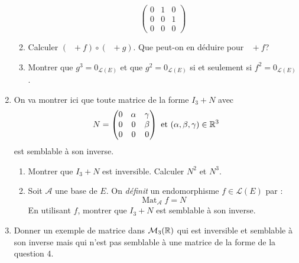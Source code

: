 \begin{enumerate}
\begin{enumerate}
\begin{displaymath}
\begin{pmatrix}
 0&1&0\\0&0&1\\0&0&0
\end{pmatrix}
\end{displaymath}
\item Calculer 
$(\mathop{\mathrm{id}_E}+f)\circ  (\mathop{\mathrm{id}_E}+g)$.
 Que peut-on en déduire pour $\mathop{\mathrm{id}_E}+f$?
\item Montrer que $g^3= 0_{\mathcal L(E)}$ et que  $g^2=0_{\mathcal L(E)}$ si et seulement si $f^2=0_{\mathcal L(E)}$.
\end{enumerate}
\item On va montrer ici que toute matrice de la forme $I_3+N$ avec
\begin{displaymath}
N=
 \begin{pmatrix}
  0&\alpha&\gamma\\0&0&\beta\\0&0&0
 \end{pmatrix}
\text{ et }
(\alpha,\beta,\gamma)\in \mathbb{R}^3
\end{displaymath}
est semblable à son inverse.
\begin{enumerate}
 \item Montrer que $I_3+N$ est inversible. Calculer $N^2$ et $N^3$.
 \item Soit $\mathcal A$ une base de $E$. On \emph{définit} un endomorphisme $f\in \mathcal L(E)$ par :
\begin{displaymath}
 \mathop{\mathrm{Mat}}_{\mathcal A}f = N
\end{displaymath}
En utilisant $f$, montrer que $I_3+N$ est semblable à son inverse.
\end{enumerate}
\item Donner un exemple de matrice dans $\mathcal M_3(\mathbb{R})$ qui est inversible et semblable à son inverse mais qui n'est pas semblable à une matrice de la forme de la question 4.
\end{enumerate}
 
